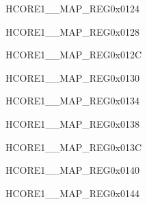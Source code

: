 \begin{register}{H}{CORE1\_\_MAP\_REG}{0x0124}\label{regdesc:CORE1KMINTMAPREG}
\end{register}\vspace{-3em}

\begin{register}{H}{CORE1\_\_MAP\_REG}{0x0128}\label{regdesc:CORE1GPIOINT0MAPREG}
\end{register}\vspace{-3em}


\begin{register}{H}{CORE1\_\_MAP\_REG}{0x012C}\label{regdesc:CORE1GPIOINT1MAPREG}
\end{register}\vspace{-3em}


\begin{register}{H}{CORE1\_\_MAP\_REG}{0x0130}\label{regdesc:CORE1GPIOINT2MAPREG}
\end{register}\vspace{-3em}


\begin{register}{H}{CORE1\_\_MAP\_REG}{0x0134}\label{regdesc:CORE1GPIOINT3MAPREG}
\end{register}\vspace{-3em}


\begin{register}{H}{CORE1\_\_MAP\_REG}{0x0138}\label{regdesc:CORE1GPIOPADCOMPINTMAPREG}
\end{register}\vspace{-3em}


\begin{register}{H}{CORE1\_\_MAP\_REG}{0x013C}\label{regdesc:CORE1CPUINTFROMCPU0MAPREG}
\end{register}\vspace{-3em}


\begin{register}{H}{CORE1\_\_MAP\_REG}{0x0140}\label{regdesc:CORE1CPUINTFROMCPU1MAPREG}
\end{register}\vspace{-3em}


\begin{register}{H}{CORE1\_\_MAP\_REG}{0x0144}\label{regdesc:CORE1CPUINTFROMCPU2MAPREG}
\end{register}\vspace{-3em}


